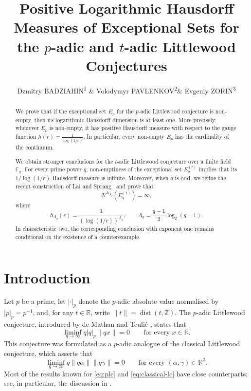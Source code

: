 \documentclass[11pt]{article}
\title{Positive Logarithmic Hausdorff Measures of Exceptional Sets for the $p$-adic and $t$-adic Littlewood Conjectures}
\author{Dzmitry BADZIAHIN\textsuperscript{1} \& Volodymyr PAVLENKOV\textsuperscript{2}\& Evgeniy ZORIN\textsuperscript{3}}
\date{}
\theoremstyle{remark}
\newcommand{\Z}{\mathbb{Z}}
\newcommand{\R}{\mathbb{R}}
\newcommand{\dist}{\operatorname{dist}}
\begin{document}
\maketitle

\let\thefootnote\relax{}
\let\thefootnote\relax{}
\let\thefootnote\relax{}

\begin{abstract}
We prove that if the exceptional set $E_p$ for the $p$-adic Littlewood
conjecture is non-empty, then its logarithmic Hausdorff dimension is at least
one.  More precisely, whenever $E_p$ is non-empty, it has positive Hausdorff
measure with respect to the gauge function
$
h(r)=\frac{1}{\log(1/r)}.
$
In particular, every non-empty $E_p$ has the cardinality of the continuum.

We obtain stronger conclusions for the $t$-adic Littlewood conjecture over a
finite field $\mathbb F_q$.  For every prime power $q$, non-emptiness of the
exceptional set $E_q^{(t)}$ implies that its $1/\log(1/r)$-Hausdorff measure is
infinite.  Moreover,  when $q$ is odd, we refine the recent construction of Lai and
Sprang~\cite{LaiSprang2026} and prove that
\[
    \mathcal H^{h_{A_q}}(E_q^{(t)})=\infty,
\]
where
\[
    h_{A_q}(r)=\frac{1}{(\log(1/r))^{A_q}},
    \qquad
    A_q=\frac{q-1}{2}\log_2(q-1).
\]
In characteristic two, the corresponding conclusion with exponent one
remains conditional on the existence of a counterexample.
\end{abstract}

\section{Introduction}

Let $p$ be a prime, let $|\cdot|_p$ denote the $p$-adic absolute value
normalised by $|p|_p=p^{-1}$, and, for any $t\in\R$, write $\|t\|=\dist(t,\Z)$.  The $p$-adic
Littlewood conjecture, introduced by de Mathan and Teuli\'e
\cite{deMathanTeulie2004}, states that
\begin{equation} \label{eq:plc}
    \liminf_{q\to\infty}q|q|_p\|qx\|=0
    \qquad\text{for every $x\in\mathbb R$.}
\end{equation}
This conjecture was formulated as a $p$-adic analogue of the classical
Littlewood conjecture, which asserts that
\begin{equation} \label{eq:classical-lc}
    \liminf_{q\to\infty}q\|q\alpha\|\|q\gamma\|=0
    \qquad\text{for every $(\alpha,\gamma)\in\mathbb R^2$.}
\end{equation}
Most of the results known for \eqref{eq:plc} and
\eqref{eq:classical-lc} have close counterparts; see, in particular, the
discussion in \cite[Section~1.2]{EinsiedlerKleinbock2007}.
\end{document}
